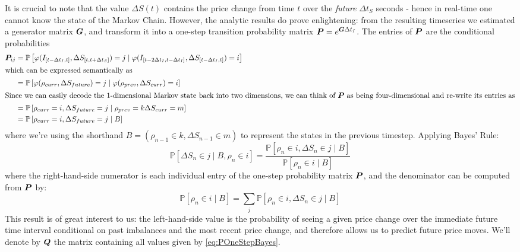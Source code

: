 It is crucial to note that the value $\Delta S(t)$ contains the price change from time $t$ over the \textit{future} $\Delta t_S$ seconds - hence in real-time one cannot know the state of the Markov Chain. However, the analytic results do prove enlightening: from the resulting timeseries we estimated a generator matrix $\boldsymbol{G}$, and transform it into a one-step transition probability matrix $\boldsymbol{P} = e^{\boldsymbol{G}\Delta t_I}$. The entries of $\boldsymbol{P}$ are the conditional probabilities 
\begin{align}
\boldsymbol{P}_{ij} & = \mathbb{P}\left[ \varphi( I_{[t-\Delta t_I, t]}, \Delta S_{[t,t+\Delta t_S]}) = j \; | \; \varphi( I_{[t-2\Delta t_I, t-\Delta t_I]}, \Delta S_{[t-\Delta t_I, t]} ) = i \right] \label{eq:POneStepUgly} \\
\intertext{which can be expressed semantically as}
& = \mathbb{P}\left[ \varphi( \rho_{curr}, \Delta S_{future}) = j \; | \; \varphi( \rho_{prev}, \Delta S_{curr} ) = i \right] \label{eq:POneStepNice} \\
\intertext{Since we can easily decode the 1-dimensional Markov state back into two dimensions, we can think of $\boldsymbol{P}$ as being four-dimensional and re-write its entries as}
& = \mathbb{P}\left[ \rho_{curr} = i,  \Delta S_{future} = j \; | \; \rho_{prev} = k \Delta S_{curr} = m \right] \\
& = \mathbb{P}\left[ \rho_{curr} = i,  \Delta S_{future} = j \; | \; B \right]
\end{align}
where we're using the shorthand $B = (\rho_{n-1} \in k, \Delta S_{n-1} \in m)$ to represent the states in the previous timestep. Applying Bayes' Rule:
\begin{equation}\label{eq:POneStepBayes}
\mathbb{P}\left[ \Delta S_n \in j \; | \; B, \rho_n \in i \right] = \dfrac{\mathbb{P}\left[ \rho_n \in i, \Delta S_n \in j \; | \; B \right]}{\mathbb{P}\left[ \rho_n \in i \; | \; B \right]}
\end{equation}
where the right-hand-side numerator is each individual entry of the one-step probability matrix $\boldsymbol{P}$, and the denominator can be computed from $\boldsymbol{P}$ by:
\begin{equation}\label{eq:POneStepBayesDenom}
\mathbb{P}\left[ \rho_n \in i \; | \; B \right] = \sum\limits_j \mathbb{P}\left[ \rho_n \in i,  \Delta S_n \in j \; | \; B \right]
\end{equation}
This result is of great interest to us: the left-hand-side value is the probability of seeing a given price change over the immediate future time interval conditional on past imbalances and the most recent price change, and therefore allows us to predict future price moves. We'll denote by $\boldsymbol{Q}$ the matrix containing all values given by \eqref{eq:POneStepBayes}.

